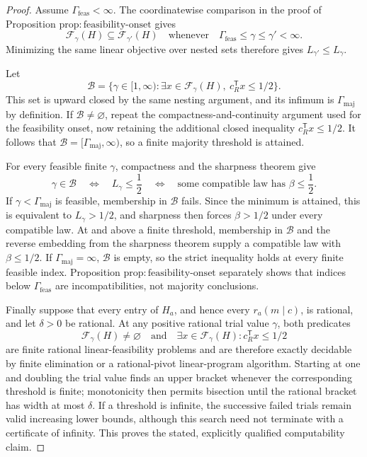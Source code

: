 \documentclass{article}
\begin{document}
\begin{proof}
Assume \(\Gamma_{\mathrm{feas}}<\infty\).  The coordinatewise comparison in the proof of Proposition \(\mathrm{prop:feasibility\mbox{-}onset}\) gives
\[
\mathcal F_{\gamma}(H)\subseteq\mathcal F_{\gamma'}(H)
\quad\text{whenever}\quad
\Gamma_{\mathrm{feas}}\le\gamma\le\gamma'<\infty.
\]
Minimizing the same linear objective over nested sets therefore gives \(L_{\gamma'}\le L_{\gamma}\).

Let
\[
\mathscr B=\{\gamma\in[1,\infty):
\exists x\in\mathcal F_{\gamma}(H),\ c_R^{\mathsf T}x\le1/2\}.
\]
This set is upward closed by the same nesting argument, and its infimum is \(\Gamma_{\mathrm{maj}}\) by definition.  If \(\mathscr B\ne\varnothing\), repeat the compactness-and-continuity argument used for the feasibility onset, now retaining the additional closed inequality \(c_R^{\mathsf T}x\le1/2\).  It follows that \(\mathscr B=[\Gamma_{\mathrm{maj}},\infty)\), so a finite majority threshold is attained.

For every feasible finite \(\gamma\), compactness and the sharpness theorem give
\[
\gamma\in\mathscr B
\quad\Longleftrightarrow\quad
L_{\gamma}\le\frac12
\quad\Longleftrightarrow\quad
\text{some compatible law has }\beta\le\frac12.
\]
If \(\gamma<\Gamma_{\mathrm{maj}}\) is feasible, membership in \(\mathscr B\) fails.  Since the minimum is attained, this is equivalent to \(L_{\gamma}>1/2\), and sharpness then forces \(\beta>1/2\) under every compatible law.  At and above a finite threshold, membership in \(\mathscr B\) and the reverse embedding from the sharpness theorem supply a compatible law with \(\beta\le1/2\).  If \(\Gamma_{\mathrm{maj}}=\infty\), \(\mathscr B\) is empty, so the strict inequality holds at every finite feasible index.  Proposition \(\mathrm{prop:feasibility\mbox{-}onset}\) separately shows that indices below \(\Gamma_{\mathrm{feas}}\) are incompatibilities, not majority conclusions.

Finally suppose that every entry of \(H_a\), and hence every \(r_a(m\mid c)\), is rational, and let \(\delta>0\) be rational.  At any positive rational trial value \(\gamma\), both predicates
\[
\mathcal F_{\gamma}(H)\ne\varnothing
\quad\text{and}\quad
\exists x\in\mathcal F_{\gamma}(H):c_R^{\mathsf T}x\le1/2
\]
are finite rational linear-feasibility problems and are therefore exactly decidable by finite elimination or a rational-pivot linear-program algorithm.  Starting at one and doubling the trial value finds an upper bracket whenever the corresponding threshold is finite; monotonicity then permits bisection until the rational bracket has width at most \(\delta\).  If a threshold is infinite, the successive failed trials remain valid increasing lower bounds, although this search need not terminate with a certificate of infinity.  This proves the stated, explicitly qualified computability claim.
\end{proof}
\end{document}
